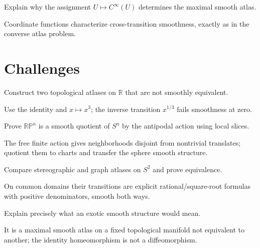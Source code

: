 \begin{problem}\label{prob:vii02-12}
Explain why the assignment \(U\mapsto C^\infty(U)\) determines the maximal smooth atlas.
\end{problem}
\begin{solution}
Coordinate functions characterize cross-transition smoothness, exactly as in the converse atlas problem.
\end{solution}

\section{Challenges}
\begin{problem}[Challenge]\label{chal:vii02-01}
Construct two topological atlases on \(\mathbb R\) that are not smoothly equivalent.
\end{problem}
\begin{solution}
Use the identity and \(x\mapsto x^3\); the inverse transition \(x^{1/3}\) fails smoothness at zero.
\end{solution}

\begin{problem}[Challenge]\label{chal:vii02-02}
Prove \(\mathbb{RP}^n\) is a smooth quotient of \(S^n\) by the antipodal action using local slices.
\end{problem}
\begin{solution}
The free finite action gives neighborhoods disjoint from nontrivial translates; quotient them to charts and transfer the sphere smooth structure.
\end{solution}

\begin{problem}[Challenge]\label{chal:vii02-03}
Compare stereographic and graph atlases on \(S^2\) and prove equivalence.
\end{problem}
\begin{solution}
On common domains their transitions are explicit rational/square-root formulas with positive denominators, smooth both ways.
\end{solution}

\begin{problem}[Challenge]\label{chal:vii02-04}
Explain precisely what an exotic smooth structure would mean.
\end{problem}
\begin{solution}
It is a maximal smooth atlas on a fixed topological manifold not equivalent to another; the identity homeomorphism is not a diffeomorphism.
\end{solution}

